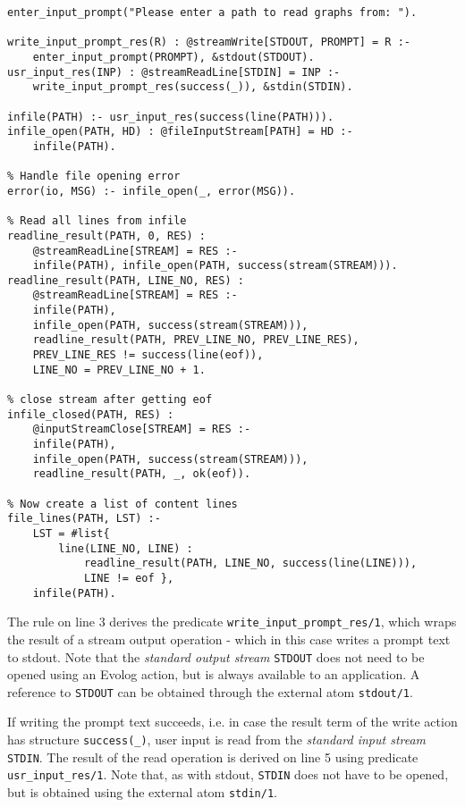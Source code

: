 \begin{lstlisting}[style=asp-code, label={lst:results-xml-graphcol-userinput}, caption={Reading a file based on user input.}] 
enter_input_prompt("Please enter a path to read graphs from: ").

write_input_prompt_res(R) : @streamWrite[STDOUT, PROMPT] = R :- 
    enter_input_prompt(PROMPT), &stdout(STDOUT).
usr_input_res(INP) : @streamReadLine[STDIN] = INP :- 
    write_input_prompt_res(success(_)), &stdin(STDIN).

infile(PATH) :- usr_input_res(success(line(PATH))).
infile_open(PATH, HD) : @fileInputStream[PATH] = HD :- 
    infile(PATH).

% Handle file opening error
error(io, MSG) :- infile_open(_, error(MSG)).

% Read all lines from infile 
readline_result(PATH, 0, RES) : 
    @streamReadLine[STREAM] = RES :- 
    infile(PATH), infile_open(PATH, success(stream(STREAM))).
readline_result(PATH, LINE_NO, RES) : 
    @streamReadLine[STREAM] = RES :- 
    infile(PATH), 
    infile_open(PATH, success(stream(STREAM))), 
    readline_result(PATH, PREV_LINE_NO, PREV_LINE_RES), 
    PREV_LINE_RES != success(line(eof)), 
    LINE_NO = PREV_LINE_NO + 1.

% close stream after getting eof
infile_closed(PATH, RES) : 
    @inputStreamClose[STREAM] = RES :- 
    infile(PATH), 
    infile_open(PATH, success(stream(STREAM))),
    readline_result(PATH, _, ok(eof)).

% Now create a list of content lines
file_lines(PATH, LST) :- 
    LST = #list{ 
        line(LINE_NO, LINE) : 
            readline_result(PATH, LINE_NO, success(line(LINE))), 
            LINE != eof },
    infile(PATH). 
\end{lstlisting}    

The rule on line 3 derives the predicate \texttt{write\_input\_prompt\_res/1}, which wraps the result of a stream output operation - which in this case writes a prompt text to stdout. Note that the \emph{standard output stream} \texttt{STDOUT} does not need to be opened using an Evolog action, but is always available to an application. A reference to \texttt{STDOUT} can be obtained through the external atom \texttt{stdout/1}.

If writing the prompt text succeeds, i.e. in case the result term of the write action has structure \texttt{success(\_)}, user input is read from the \emph{standard input stream} \texttt{STDIN}. The result of the read operation is derived on line 5 using  predicate \texttt{usr\_input\_res/1}. Note that, as with stdout, \texttt{STDIN} does not have to be opened, but is obtained using the external atom \texttt{stdin/1}.

